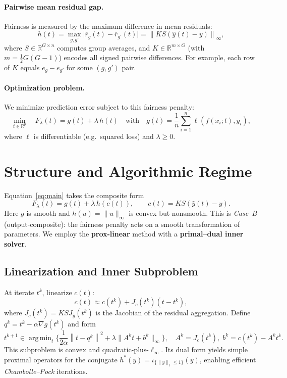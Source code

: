 \documentclass[11pt]{article}
\theoremstyle{plain}
\theoremstyle{definition}
\newcommand{\R}{\mathbb{R}}
\newcommand{\argmin}{\mathop{\mathrm{arg\,min}}}
\newcommand{\norm}[1]{\left\lVert #1 \right\rVert}
\newcommand{\1}{\mathbf{1}}
\renewcommand{\R}{\mathbb{R}}
\begin{document}
\paragraph{Pairwise mean residual gap.}
Fairness is measured by the maximum difference in mean residuals:
\begin{equation}\label{eq:pairwise-gap}
h(t)=\max_{g,g'} \big|\overline{r}_g(t)-\overline{r}_{g'}(t)\big|
= \norm{K S (\hat y(t)-y)}_\infty,
\end{equation}
where $S\in\R^{G\times n}$ computes group averages,
and $K\in\R^{m\times G}$ (with $m=\tfrac{1}{2}G(G-1)$) encodes all signed pairwise differences.
For example, each row of $K$ equals $e_g-e_{g'}$ for some $(g,g')$ pair.

\paragraph{Optimization problem.}
We minimize prediction error subject to this fairness penalty:
\begin{equation}\label{eq:main}
\min_{t\in\R^p} \quad F_\lambda(t)=
g(t)+\lambda\,h(t)
\quad\text{with}\quad
g(t)=\frac{1}{n}\sum_{i=1}^n \ell(f(x_i;t),y_i),
\end{equation}
where $\ell$ is differentiable (e.g.\ squared loss) and $\lambda\ge0$.

\section{Structure and Algorithmic Regime}
Equation~\eqref{eq:main} takes the composite form
\[
F_\lambda(t)=g(t)+\lambda\,h(c(t)),\qquad
c(t)=K S (\hat y(t)-y).
\]
Here $g$ is smooth and $h(u)=\|u\|_\infty$ is convex but nonsmooth.
This is \emph{Case~B} (output-composite): the fairness penalty acts on a smooth transformation of parameters.
We employ the \textbf{prox-linear} method with a \textbf{primal–dual inner solver}.

\subsection{Linearization and Inner Subproblem}

At iterate $t^k$, linearize $c(t)$:
\[
c(t)\approx c(t^k)+J_c(t^k)(t-t^k),
\]
where $J_c(t^k)=K S J_{\hat y}(t^k)$ is the Jacobian of the residual aggregation.
Define $q^k=t^k-\alpha\nabla g(t^k)$ and form
\begin{equation}\label{eq:proxlin-sub}
t^{k+1}\in
\argmin_t
\Big\{
\frac{1}{2\alpha}\norm{t-q^k}^2
+ \lambda\big\|A^k t+b^k\big\|_\infty
\Big\},
\quad
A^k=J_c(t^k),\; b^k=c(t^k)-A^k t^k.
\end{equation}
This subproblem is convex and quadratic-plus-$\ell_\infty$.
Its dual form yields simple proximal operators for the conjugate $h^*(y)=\iota_{\{\|y\|_1\le1\}}(y)$,
enabling efficient \emph{Chambolle–Pock} iterations.
\end{document}
